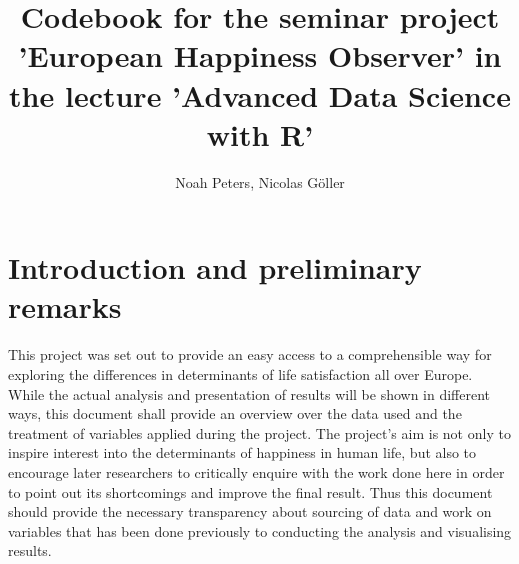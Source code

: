 \documentclass[preprint,12pt,authoryear]{elsarticle}
\begin{document}
\begin{frontmatter}



\title{Codebook for the seminar project 'European Happiness Observer' in the lecture 'Advanced Data Science with R'}


\author{Noah Peters, Nicolas Göller}

\address{Zeppelin University, Fallenbrunnen 3, 88045 Friedrichshafen}

\end{frontmatter}


\tableofcontents
\newpage

\section{Introduction and preliminary remarks}
\label{}
This project was set out to provide an easy access to a comprehensible way for exploring the differences in determinants of life satisfaction all over Europe. While the actual analysis and presentation of results will be shown in different ways, this document shall provide an overview over the data used and the treatment of variables applied during the project. The project's aim is not only to inspire interest into the determinants of happiness in human life, but also to encourage later researchers to critically enquire with the work done here in order to point out its shortcomings and improve the final result. Thus this document should provide the necessary transparency about sourcing of data and work on variables that has been done previously to conducting the analysis and visualising results.
 
\end{document}
